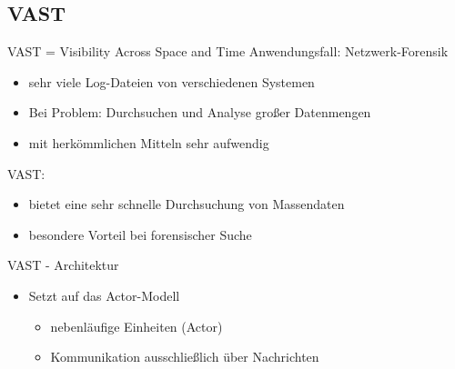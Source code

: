 \documentclass[9pt]{beamer}
\begin{document}
\subsection{VAST}

\begin{frame}{VAST = Visibility Across Space and Time}{}
	Anwendungsfall: Netzwerk-Forensik
	\begin{itemize}
		\item sehr viele Log-Dateien von verschiedenen Systemen
		\item Bei Problem: Durchsuchen und Analyse großer Datenmengen
		\item mit herkömmlichen Mitteln sehr aufwendig
	\end{itemize}
	VAST:
	\begin{itemize}
		\item bietet eine sehr schnelle Durchsuchung von Massendaten
		\item besondere Vorteil bei forensischer Suche
	\end{itemize}
\end{frame}

\begin{frame}{VAST - Architektur}{}
	\begin{itemize}
		\item Setzt auf das Actor-Modell
		\begin{itemize}
			\item nebenläufige Einheiten (Actor)
			\item Kommunikation ausschließlich über Nachrichten
		\end{itemize}
	\end{itemize}
\end{frame}
\end{document}
